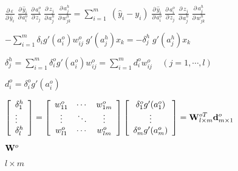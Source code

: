 \documentclass{article}
\def\lthtmlcheckvsize{\ifdim\ht\sizebox<\vsize 
  \ifdim\wd\sizebox<\hsize\expandafter\hfill\fi \expandafter\vfill
  \else\expandafter\vss\fi}%
\begin{document}
{\newpage\clearpage
{}%
$\displaystyle \frac{\partial\,\varepsilon}{\partial\, \hat{y}_i}\;
\frac{\partial\, \hat{y}_i}{\partial\, a^o_i}\;
\frac{\partial\, a^o_i}{\partial\, z_j}\;
\frac{\partial\, z_j}{\partial\, a^h_j}\;
\frac{\partial\, a^h_j}{\partial\, w_{jk}^h}
=\sum_{i=1}^m\;(\hat{y}_i-y_i)\;\frac{\partial\, \hat{y}_i}{\partial\, a^o_i}\;
\frac{\partial\, a^o_i}{\partial\, z_j}\;
\frac{\partial\, z_j}{\partial\, a^h_j}\;
\frac{\partial\, a^h_j}{\partial\, w_{jk}^h}$%
\lthtmlindisplaymathZ
\lthtmlcheckvsize\clearpage}

{\newpage\clearpage
{}%
$\displaystyle -\sum_{i=1}^m \delta_ig'(a^o_i)w_{ij}^o\;g'(a^h_j)x_k
=-\delta_j^{h}\;g'(a^h_j)x_k$%
\lthtmlindisplaymathZ
\lthtmlcheckvsize\clearpage}

{\newpage\clearpage
{}%
$\displaystyle \delta_j^h=\sum_{i=1}^m \delta_i^o g'(a^o_i)w_{ij}^o
=\sum_{i=1}^m d_i^o w_{ij}^o      \;\;\;\;(j=1,\cdots,l)$%
\lthtmlindisplaymathZ
\lthtmlcheckvsize\clearpage}

{\newpage\clearpage
{}%
$ d_i^o=\delta_i^o g'(a^o_i)$%
\lthtmlindisplaymathZ
\lthtmlcheckvsize\clearpage}

{\newpage\clearpage
{}%
$\displaystyle \left[\begin{array}{l}\delta_1^h\\\vdots\\\delta_l^h\end{array}\right]
=\left[\begin{array}{ccc}w_{11}^o & \cdots &w_{1m}^o\\
\vdots & \ddots & \vdots \\w_{l1}^o & \cdots & w_{lm}^o
\end{array}\right]
\left[\begin{array}{c}\delta_1^og'(a_1^o)\\\vdots\\\delta_m^og'(a_m^o)
\end{array}\right]
={\bf W}^{oT}_{l\times m}{\bf d}^o_{m\times 1}$%
\lthtmlindisplaymathZ
\lthtmlcheckvsize\clearpage}

{\newpage\clearpage
{}%
$ {\bf W}^o$%
\lthtmlindisplaymathZ
\lthtmlcheckvsize\clearpage}

{\newpage\clearpage
{}%
$ l\times m$%
\lthtmlindisplaymathZ
\lthtmlcheckvsize\clearpage}
\end{document}
